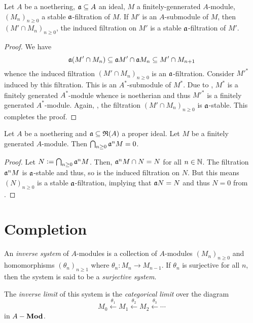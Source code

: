 \begin{lemma}
    Let $A$ be a noethering, $\mathfrak a\subseteq A$ an ideal, $M$ a finitely-gennerated $A$-module, $(M_n)_{n\ge 0}$ a stable $\mathfrak a$-filtration of $M$. If $M'$ is an $A$-submodule of $M$, then $(M'\cap M_n)_{n\ge 0}$, the induced filtration on $M'$ is a stable $\mathfrak a$-filtration of $M'$.
\end{lemma}
\begin{proof}
    We have 
    \begin{equation*}
        \mathfrak a(M'\cap M_n)\subseteq\mathfrak a M'\cap\mathfrak a M_n\subseteq M'\cap M_{n + 1}
    \end{equation*}
    whence the induced filtration $(M'\cap M_n)_{n\ge 0}$ is an $\mathfrak a$-filtration. Consider $M'^\ast$ induced by this filtration. This is an $A^\ast$-submodule of $M^\ast$. Due to , $M^\ast$ is a finitely generated $A^\ast$-module whence is noetherian and thus $M'^\ast$ is a finitely generated $A^\ast$-module. Again, , the filtration $(M'\cap M_n)_{n\ge 0}$ is $\mathfrak a$-stable. This completes the proof.
\end{proof}

\begin{corollary}
    Let $A$ be a noethering and $\mathfrak a\subseteq\mathfrak R(A)$ a proper ideal. Let $M$ be a finitely generated $A$-module. Then $\bigcap_{n\ge 0}\mathfrak a^nM=0$.
\end{corollary}
\begin{proof}
    Let $N := \bigcap_{n\ge 0}\mathfrak a^n M$. Then, $\mathfrak a^nM\cap N = N$ for all $n\in\mathbb{N}$. The filtration $\mathfrak a^nM$ is $\mathfrak a$-stable and thus, so is the induced filtration on $N$. But this means $(N)_{n\ge 0}$ is a stable $\mathfrak a$-filtration, implying that $\mathfrak a N = N$ and thus $N = 0$ from .
\end{proof}


\section{Completion}

\begin{definition}
    An \emph{inverse system} of $A$-modules is a collection of $A$-modules $(M_n)_{n\ge 0}$ and homomorphisms $(\theta_n)_{n\ge 1}$ where $\theta_n: M_n\to M_{n - 1}$. If $\theta_n$ is surjective for all $n$, then the system is said to be a \emph{surjective system}.

    The \emph{inverse limit} of this system is the \emph{categorical limit} over the diagram 
    \begin{equation*}
        M_0\stackrel{\theta_1}{\longleftarrow} M_1\stackrel{\theta_2}{\longleftarrow} M_2\stackrel{\theta_3}{\longleftarrow}\cdots
    \end{equation*}
    in $A-\mathbf{Mod}$.
\end{definition}

